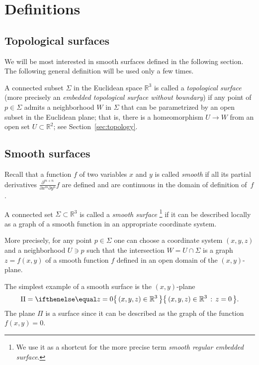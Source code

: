\chapter{Definitions}
\label{chap:surfaces-def}

\section{Topological surfaces}

We will be most interested in smooth surfaces defined in the following section.
The following general definition will be used only a few times.

A connected subset $\Sigma$ in the Euclidean space $\mathbb{R}^3$
is called a \emph{topological surface} (more precisely an {}\emph{embedded topological surface without boundary}) 
if any point of $p\in \Sigma$ admits a neighborhood $W$ in $\Sigma$ 
that can be parametrized by an open subset in the Euclidean plane; 
that is, there is a homeomorphism $U\to W$ from an open set $U\subset \mathbb{R}^2$; see Section~\ref{sec:topology}.


\section{Smooth surfaces}\label{sec:def-smooth-surface}

Recall that a function $f$ of two variables $x$ and $y$ is called \emph{smooth} if all its partial derivatives $\frac{\partial^{m+n}}{\partial x^m\partial y^n}f$ are defined and are continuous in the domain of definition of~$f$. 

A connected set $\Sigma \subset \mathbb{R}^3$ is called a \emph{smooth surface}%
\footnote{We use it as a shortcut for the more precise term {}\emph{smooth regular embedded surface}.} if it can be described locally as a graph of a smooth function in an appropriate coordinate system.

More precisely, for any point $p\in \Sigma$ one can choose a coordinate system $(x,y,z)$ and a neighborhood $U\ni p$ such that
the intersection $W=U\cap \Sigma$ is a graph $z=f(x,y)$ of a smooth function $f$ defined in an open domain of the $(x,y)$-plane.

The simplest example of a smooth surface is the $(x,y)$-plane 
\[\Pi=\set{(x,y,z)\in\mathbb{R}^3}{z=0}.\]
The plane $\Pi$ is a surface since
it can be described as the graph of the function $f(x,y)=0$.

